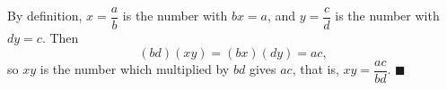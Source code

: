 By definition, $x=\dfrac ab$ is the number with $bx=a$, and $y=\dfrac cd$ is the number with $dy=c$. Then
\[(bd)(xy)=(bx)(dy)=ac,\]
so $xy$ is the number which multiplied by $bd$ gives $ac$, that is, $xy=\dfrac{ac}{bd}$. $\blacksquare$
